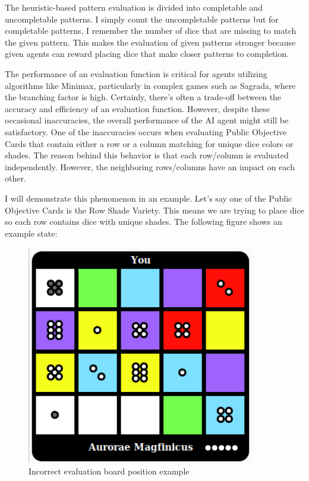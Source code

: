 The heuristic-based pattern evaluation is divided into completable and uncompletable patterns. I simply count the uncompletable
patterns but for completable patterns, I remember the number of dice that are missing to match
the given pattern. This makes the evaluation of given patterns stronger because given agents can reward
placing dice that make closer patterns to completion. 

The performance of an evaluation function is critical for agents utilizing algorithms like Minimax, particularly in complex games 
such as Sagrada, where the branching factor is high. Certainly, there's often a trade-off between the accuracy and efficiency of an evaluation function. 
However, despite these occasional inaccuracies, the overall performance of the AI agent might still be satisfactory.
One of the inaccuracies occurs when evaluating Public Objective Cards that contain either a row or a column matching for unique dice colors or shades.
The reason behind this behavior is that each row/column is evaluated independently. However, the neighboring rows/columns have an impact on each other.


I will demonstrate this phenomenon in an example. Let's say one of the Public Objective Cards is the Row Shade Variety. This means we are trying
to place dice so each row contains dice with unique shades. The following figure shows an example state:


\begin{figure}[H]
    \caption{ Incorrect evaluation board position example}
    \centerline{\mbox{\includegraphics[width=100mm]{img/IncorrectBoardEvaluationExample.png}}}
    \label{fig:example}
\end{figure}


